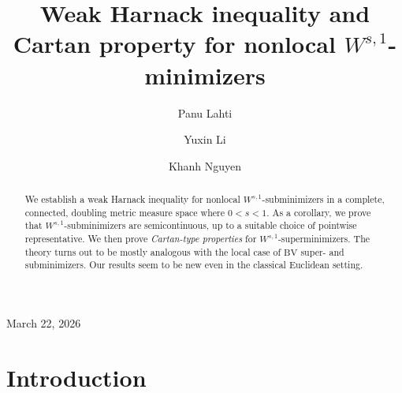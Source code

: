 \documentclass[11pt,leqno]{amsart}
\title[Weak Harnack inequality and Cartan property]{Weak Harnack inequality and Cartan property for   nonlocal $W^{s,1}$-minimizers}
\author{Panu Lahti}
\author{Yuxin Li}
\author{Khanh Nguyen}
\numberwithin{equation}{section}
\theoremstyle{definition}
\newcommand{\BV}{\mathrm{BV}}
\begin{document}
	
	\maketitle
	\begin{center}
		March 22, 2026
	\end{center}
	
	
	\begin{abstract}
		We establish a 
		weak Harnack inequality for  nonlocal
		$W^{s,1}$-subminimizers 
		in a complete, connected, doubling metric
		measure space where $0<s<1$. As a
		corollary, we prove that $W^{s,1}$-subminimizers are semicontinuous,
		up to a suitable choice of pointwise representative.
		We then prove \emph{Cartan-type properties}
		for $W^{s,1}$-superminimizers.
		The theory turns out to be mostly analogous with the local case
		of $\BV$ super- and subminimizers.
		Our results seem to be new even in the classical Euclidean setting.
	\end{abstract}
	
	\tableofcontents
	
	\section{Introduction}
	
\end{document}
